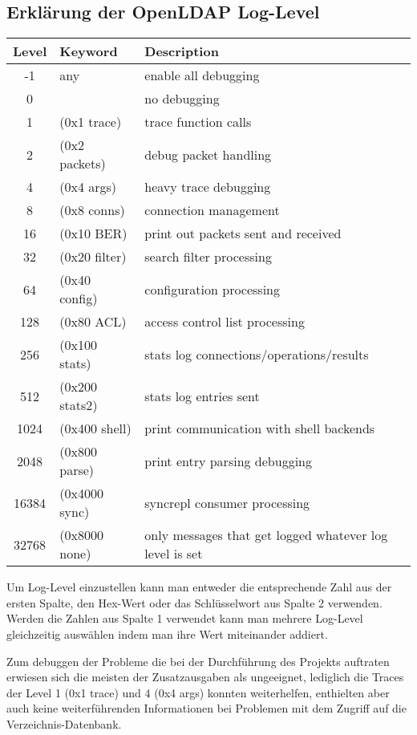 \subsection{Erklärung der OpenLDAP Log-Level} \label{sec:LDAP-Loglevel}
\begin{tabularx}{\textwidth}{|c|l|X|}
\hline
Level &	Keyword &	Description\\
\hline
-1 &	any &	enable all debugging\\
\hline
0 &	  &	no debugging\\
\hline
1 &	(0x1 trace) &	trace function calls\\
\hline
2 &	(0x2 packets) &	debug packet handling\\
\hline
4 &	(0x4 args) &	heavy trace debugging\\
\hline
8 &	(0x8 conns)& 	connection management\\
\hline
16 &	(0x10 BER) & 	print out packets sent and received\\
\hline
32 &	(0x20 filter) &	search filter processing\\
\hline
64 &	(0x40 config) &	configuration processing\\
\hline
128 &	(0x80 ACL) &	access control list processing\\
\hline
256 &	(0x100 stats) &	stats log connections/operations/results\\
\hline
512 &	(0x200 stats2) &	stats log entries sent\\
\hline
1024 &	(0x400 shell) &	print communication with shell backends\\
\hline
2048 &	(0x800 parse) &	print entry parsing debugging\\
\hline
16384 &	(0x4000 sync) &	syncrepl consumer processing\\
\hline
32768 &	(0x8000 none) &	only messages that get logged whatever log level is set \\
\hline
\end{tabularx}

\bigskip
\noindent Um Log-Level einzustellen kann man entweder die entsprechende Zahl aus der ersten Spalte, den Hex-Wert oder das Schlüsselwort aus Spalte 2 verwenden. Werden die Zahlen aus Spalte 1 verwendet kann man mehrere Log-Level gleichzeitig auswählen indem man ihre Wert miteinander addiert.

Zum debuggen der Probleme die bei der Durchführung des Projekts auftraten erwiesen sich die meisten der Zusatzausgaben als ungeeignet, lediglich die Traces der Level 1 (0x1 trace) und 4 (0x4 args) konnten weiterhelfen, enthielten aber auch keine weiterführenden Informationen bei Problemen mit dem Zugriff auf die Verzeichnis-Datenbank.

